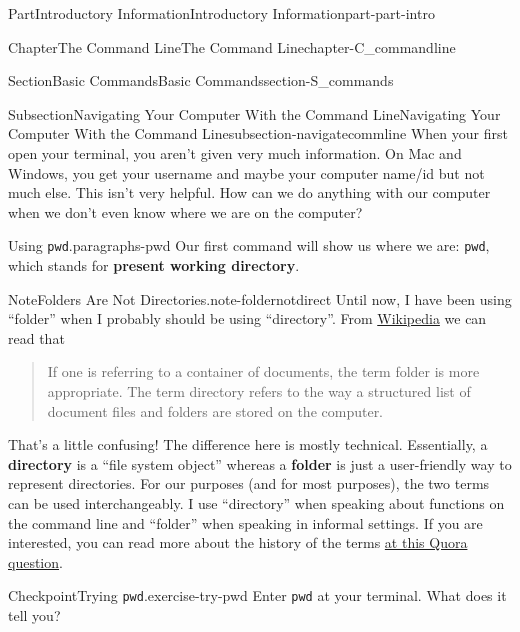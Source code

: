 \documentclass[oneside,10pt,]{book}
\newcommand{\mono}[1]{\texttt{#1}}
\newcommand{\terminology}[1]{\textbf{#1}}
\begin{document}
\begin{partptx}{Part}{Introductory Information}{}{Introductory Information}{}{}{part-part-intro}
\begin{chapterptx}{Chapter}{The Command Line}{}{The Command Line}{}{}{chapter-C_commandline}
\begin{sectionptx}{Section}{Basic Commands}{}{Basic Commands}{}{}{section-S_commands}
%
\begin{subsectionptx}{Subsection}{Navigating Your Computer With the Command Line}{}{Navigating Your Computer With the Command Line}{}{}{subsection-navigatecommline}
%
When your first open your terminal, you aren't given very much information. On Mac and Windows, you get your username and maybe your computer name\slash{}id but not much else. This isn't very helpful. How can we do anything with our computer when we don't even know where we are on the computer?%
\begin{paragraphs}{Using \mono{pwd}.}{paragraphs-pwd}%
\index{command line!\mono{pwd}}%
%
\index{\mono{pwd}}%
Our first command will show us where we are: \mono{pwd}, which stands for \terminology{present working directory}.%
\begin{note}{Note}{Folders Are Not Directories.}{note-foldernotdirect}%
%
%
Until now, I have been using ``folder'' when I probably should be using ``directory''. From \href{https://en.wikipedia.org/wiki/Directory_\%28computing\%29\#Folder_metaphor}{Wikipedia}\footnotemark{} we can read that%
\begin{quote}%
If one is referring to a container of documents, the term folder is more appropriate. The term directory refers to the way a structured list of document files and folders are stored on the computer.%
\end{quote}
That's a little confusing! The difference here is mostly technical. Essentially, a \terminology{directory} is a ``file system object'' whereas a \terminology{folder} is just a user-friendly way to represent directories. For our purposes (and for most purposes), the two terms can be used interchangeably. I use ``directory'' when speaking about functions on the command line and ``folder'' when speaking in informal settings. If you are interested, you can read more about the history of the terms \href{https://www.quora.com/What-is-the-difference-between-a-folder-and-a-directory}{at this Quora question}\footnotemark{}.%
\end{note}
%
%
\begin{inlineexercise}{Checkpoint}{Trying \mono{pwd}.}{exercise-try-pwd}%
Enter \mono{pwd} at your terminal. What does it tell you?%

\end{inlineexercise}
\end{paragraphs}
\end{subsectionptx}
\end{sectionptx}
\end{chapterptx}
\end{partptx}
\end{document}
